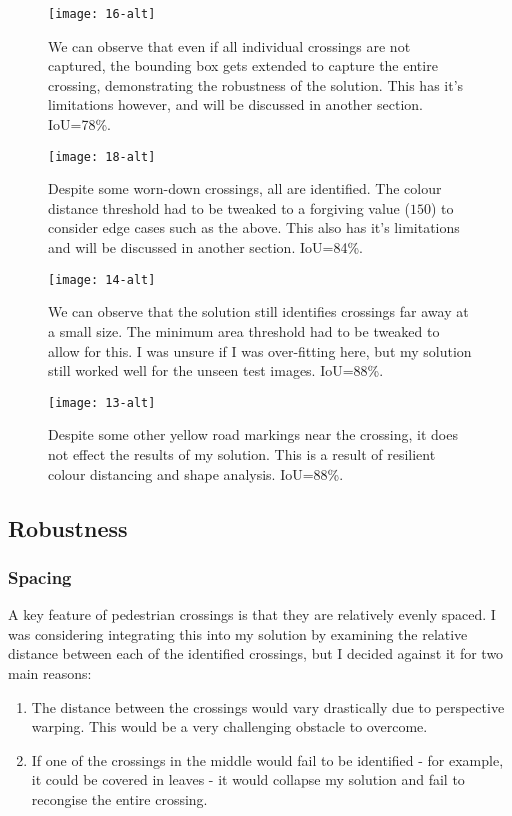 \documentclass{article}  %
\begin{document}
	\begin{figure}[H]
		\begin{minipage}[c]{0.45\linewidth}
			\centering
			\texttt{[image: 16-alt]}
			\caption{We can observe that even if all individual crossings are not captured, the bounding box gets extended to capture the entire crossing, demonstrating the robustness of the solution. This has it's limitations however, and will be discussed in another section. IoU=78\%.}
		\end{minipage}\hfill
		\begin{minipage}[c]{0.45\linewidth}
			\centering
			\texttt{[image: 18-alt]}
			\caption{Despite some worn-down crossings, all are identified. The colour distance threshold had to be tweaked to a forgiving value ($150$) to consider edge cases such as the above. This also has it's limitations and will be discussed in another section. IoU=84\%.}
		\end{minipage}
	\end{figure}
	
	\begin{figure}[H]
		\begin{minipage}[c]{0.45\linewidth}
			\centering
			\texttt{[image: 14-alt]}
			\caption{We can observe that the solution still identifies crossings far away at a small size. The minimum area threshold had to be tweaked to allow for this. I was unsure if I was over-fitting here, but my solution still worked well for the unseen test images. IoU=88\%.}
		\end{minipage}\hfill
		\begin{minipage}[c]{0.45\linewidth}
			\centering
			\texttt{[image: 13-alt]}
			\caption{Despite some other yellow road markings near the crossing, it does not effect the results of my solution. This is a result of resilient colour distancing and shape analysis. IoU=88\%.}
		\end{minipage}
	\end{figure}
	
	\newpage
	\subsection{Robustness}
	
	\subsubsection{Spacing}
	
	A key feature of pedestrian crossings is that they are relatively evenly spaced. I was considering integrating this into my solution by examining the relative distance between each of the identified crossings, but I decided against it for two main reasons: 
	\begin{enumerate}
		\item The distance between the crossings would vary drastically due to perspective warping. This would be a very challenging obstacle to overcome.
		\item If one of the crossings in the middle would fail to be identified - for example, it could be covered in leaves - it would collapse my solution and fail to recongise the entire crossing.
	\end{enumerate}
	
\end{document}
